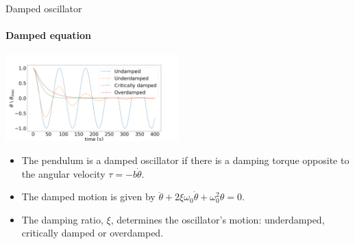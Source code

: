 \documentclass{beamer}
\begin{document}
\begin{frame}{Damped oscillator}
	\framesubtitle{Damped equation}
	\begin{center}		
		\includegraphics[width=0.5\textwidth,keepaspectratio]{damp.png}
    \end{center}
	\begin{itemize}	
		\item The pendulum is a damped oscillator if there is a damping torque opposite to the angular velocity $\tau = -b\dot{\theta}$.
		\item The damped motion is given by $\ddot{\theta} + 2\xi\omega_0\dot{\theta} + \omega_0^2\theta = 0$.
		\item The damping ratio, $\xi$, determines the oscillator's motion: underdamped, critically damped or overdamped.
	\end{itemize}
	
	
\end{frame}
\end{document}
